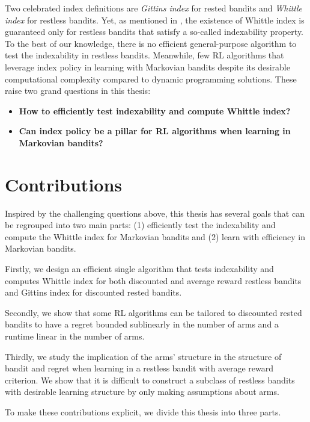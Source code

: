 Two celebrated index definitions are \emph{Gittins index} \cite{gittins1979bandit} for rested bandits and \emph{Whittle index} \cite{whittle1988restless} for restless bandits.
Yet, as mentioned in \cite[Chapter~14]{whittle1996optimal}, the existence of Whittle index is guaranteed only for restless bandits that satisfy a so-called indexability property.
To the best of our knowledge, there is no efficient general-purpose algorithm to test the indexability in restless bandits.
Meanwhile, few RL algorithms that leverage index policy in learning with Markovian bandits despite its desirable computational complexity compared to dynamic programming solutions.
These raise two grand questions in this thesis:
\begin{itemize}
    \item {\color{myblue}\bfseries\large How to efficiently test indexability and compute Whittle index?}
    \item {\color{myblue}\bfseries\large Can index policy be a pillar for RL algorithms when learning in Markovian bandits?}
\end{itemize}

\section{Contributions}

Inspired by the challenging questions above, this thesis has several goals that can be regrouped into two main parts: (1) efficiently test the indexability and compute the Whittle index for Markovian bandits and (2) learn with efficiency in Markovian bandits.

Firstly, we design an efficient single algorithm that tests indexability and computes Whittle index for both discounted and average reward restless bandits and Gittins index for discounted rested bandits.

Secondly, we show that some RL algorithms can be tailored to discounted rested bandits to have a regret bounded sublinearly in the number of arms and a runtime linear in the number of arms.

Thirdly, we study the implication of the arms' structure in the structure of bandit and regret when learning in a restless bandit with average reward criterion.
We show that it is difficult to construct a subclass of restless bandits with desirable learning structure by only making assumptions about arms.

To make these contributions explicit, we divide this thesis into three parts.

